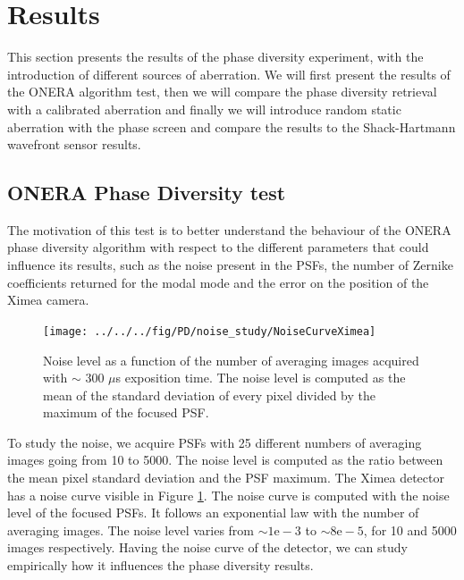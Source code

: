 \section{Results}
\label{sec:Results}

This section presents the results of the phase diversity experiment, with the introduction of different sources of aberration. We will first present the results of the ONERA algorithm test, then we will compare the phase diversity retrieval with a calibrated aberration and finally we will introduce random static aberration with the phase screen and compare the results to the Shack-Hartmann wavefront sensor results.

\subsection{ONERA Phase Diversity test}
\label{subsec:ONERAPDtest}

The motivation of this test is to better understand the behaviour of the ONERA phase diversity algorithm with respect to the different parameters that could influence its results, such as the noise present in the PSFs, the number of Zernike coefficients returned for the modal mode and the error on the position of the Ximea camera.

\begin{figure}
\begin{center}
\texttt{[image: ../../../fig/PD/noise\_study/NoiseCurveXimea]}
\decoRule
\caption{Noise level as a function of the number of averaging images acquired with $\sim$ 300 $\mu$s exposition time. The noise level is computed as the mean of the standard deviation of every pixel divided by the maximum of the focused PSF.}
\label{fig:NoiseCurve}
\end{center}
\end{figure}

To study the noise, we acquire PSFs with 25 different numbers of averaging images going from 10 to 5000. The noise level is computed as the ratio between the mean pixel standard deviation and the PSF maximum. The Ximea detector has a noise curve visible in Figure \ref{fig:NoiseCurve}. The noise curve is computed with the noise level of the focused PSFs. It follows an exponential law with the number of averaging images. The noise level varies from $\sim 1\mathrm{e}-3$ to $\sim 8\mathrm{e}-5$, for 10 and 5000 images respectively. Having the noise curve of the detector, we can study empirically how it influences the phase diversity results. 

